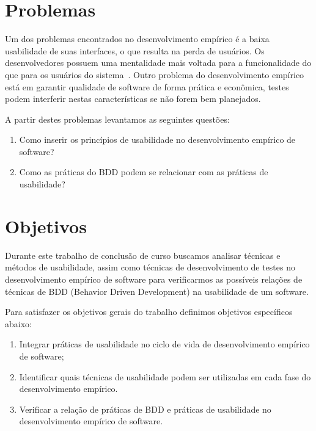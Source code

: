  

\section{Problemas}

Um dos problemas encontrados no desenvolvimento empírico é a baixa usabilidade de suas interfaces, o que resulta na perda de usuários. 
%
Os desenvolvedores possuem uma mentalidade mais voltada para a funcionalidade do que para os usuários do sistema~\cite{santos2012}. 
%
Outro problema do desenvolvimento empírico está em garantir qualidade de software de forma prática e econômica, testes podem interferir nestas características se não forem bem planejados.

A partir destes problemas levantamos as seguintes questões:
	
\begin{enumerate}
\item Como inserir os princípios de usabilidade no desenvolvimento empírico de software?
\item Como as práticas do BDD podem se relacionar com as práticas de usabilidade?
\end{enumerate}

\section{Objetivos}
	 
Durante este trabalho de conclusão de curso buscamos analisar técnicas e métodos de usabilidade, assim como técnicas de desenvolvimento de testes no desenvolvimento empírico de software para verificarmos as possíveis relações de técnicas de BDD (Behavior Driven Development) na usabilidade de um software.

Para satisfazer os objetivos gerais do trabalho definimos objetivos específicos abaixo:

\begin{enumerate}
\item Integrar práticas de usabilidade no ciclo de vida de desenvolvimento empírico de software;
\item Identificar quais técnicas de usabilidade podem ser utilizadas em cada fase do desenvolvimento empírico.
\item Verificar a relação de práticas de BDD e práticas de usabilidade no desenvolvimento empírico de software.
\end{enumerate}

